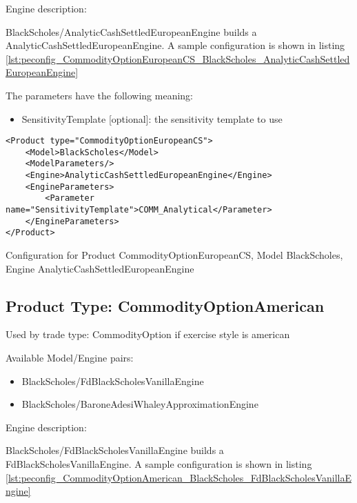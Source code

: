 Engine description:

BlackScholes/AnalyticCashSettledEuropeanEngine builds a AnalyticCashSettledEuropeanEngine. A sample configuration is shown in listing
\ref{lst:peconfig_CommodityOptionEuropeanCS_BlackScholes_AnalyticCashSettledEuropeanEngine}

The parameters have the following meaning:

\begin{itemize}
\item SensitivityTemplate [optional]: the sensitivity template to use 
\end{itemize}

\begin{longlisting}
\begin{verbatim}
<Product type="CommodityOptionEuropeanCS">
    <Model>BlackScholes</Model>
    <ModelParameters/>
    <Engine>AnalyticCashSettledEuropeanEngine</Engine>
    <EngineParameters>
        <Parameter name="SensitivityTemplate">COMM_Analytical</Parameter>
    </EngineParameters>
</Product>
\end{verbatim}
\caption{Configuration for Product CommodityOptionEuropeanCS, Model BlackScholes, Engine AnalyticCashSettledEuropeanEngine}
\label{lst:peconfig_CommodityOptionEuropeanCS_BlackScholes_AnalyticCashSettledEuropeanEngine}
\end{longlisting}

\subsection{Product Type: CommodityOptionAmerican}

Used by trade type: CommodityOption if exercise style is american

Available Model/Engine pairs:

\begin{itemize}
\item BlackScholes/FdBlackScholesVanillaEngine
\item BlackScholes/BaroneAdesiWhaleyApproximationEngine
\end{itemize}

Engine description:

BlackScholes/FdBlackScholesVanillaEngine builds a FdBlackScholesVanillaEngine. A sample configuration is shown in listing
\ref{lst:peconfig_CommodityOptionAmerican_BlackScholes_FdBlackScholesVanillaEngine}

